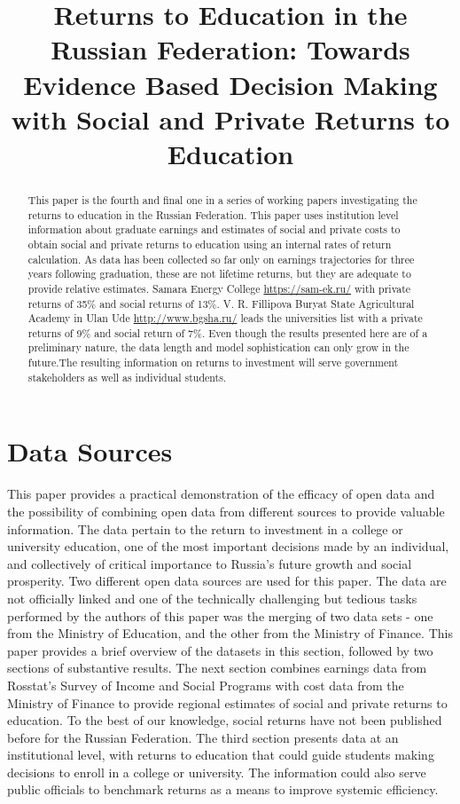\documentclass[alpha-refs]{wiley-article-05g}
\title{Returns to Education in the Russian Federation: Towards Evidence Based Decision Making with Social and Private Returns to Education}
\begin{document}
\maketitle

\begin{abstract}
\vspace{.5em}
This paper is the fourth and final one in a series of working papers investigating the returns to education in the Russian Federation. This paper uses institution level information about graduate earnings and estimates of social and private costs to obtain social and private returns to education using an internal rates of return calculation. As data has been collected so far only on earnings trajectories for three years following graduation, these are not lifetime returns, but they are adequate to provide relative estimates. Samara Energy College \url{https://sam-ek.ru/} with private returns of 35\% and social returns of 13\%. V. R. Fillipova Buryat State Agricultural Academy in Ulan Ude \url{http://www.bgsha.ru/} leads the universities list with a private returns of 9\% and social return of 7\%. Even though the results presented here are of a preliminary nature, the data length and model sophistication can only grow in the future.The resulting information on returns to investment will serve government stakeholders as well as individual students.  

\end{abstract}

\section{Data Sources}

This paper provides a practical demonstration of the efficacy of open data 
and the possibility of combining open data from different sources to 
provide valuable information. The data pertain to the return to investment 
in a college or university education, one of the most important decisions 
made by an individual, and collectively of critical importance to Russia's 
future growth and social prosperity. Two different open data sources are 
used for this paper. The data are not officially linked and one of the 
technically challenging but tedious tasks performed by the authors of this 
paper was the merging of two data sets - one from the Ministry of 
Education, and the other from the Ministry of Finance. This paper provides 
a brief overview of the datasets in this section, followed by two sections 
of substantive results. The next section combines earnings data from 
Rosstat's Survey of Income and Social Programs with cost data from the 
Ministry of Finance to provide regional estimates of social and private 
returns to education. To the best of our knowledge, social returns have not 
been published before for the Russian Federation. The third section 
presents data at an institutional level, with returns to education that 
could guide students making decisions to enroll in a college or university. 
The information could also serve public officials to benchmark returns as a 
means to improve systemic efficiency. 
\end{document}

